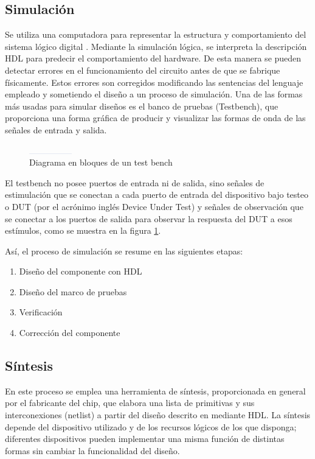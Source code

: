 \subsection{Simulación}
Se utiliza una computadora para representar la estructura y comportamiento del sistema lógico digital \citep{morris_mano}. Mediante la simulación lógica, se interpreta la descripción HDL para predecir el comportamiento del hardware. De esta manera se pueden detectar errores en el funcionamiento del circuito antes de que se fabrique físicamente. Estos errores son corregidos modificando las sentencias del lenguaje empleado y sometiendo el diseño a un proceso de simulación. Una de las formas más usadas para simular diseños es el banco de pruebas (Testbench), que proporciona una forma gráfica de producir y visualizar las formas de onda de las señales de entrada y salida.



\begin{figure}
\centering
\includegraphics[scale=.5]{./Figures/test_bench3.png}
\caption{Diagrama en bloques de un test bench}
\label{diag test bench}
\end{figure}


El testbench no posee puertos de entrada ni de salida, sino señales de estimulación que se conectan a cada puerto de entrada del dispositivo bajo testeo o DUT (por el acrónimo inglés Device Under Test) y señales de observación que se conectar a los puertos de salida para observar la respuesta del DUT a esos estímulos, como se muestra en la figura \ref{diag test bench}.

Así, el proceso de simulación se resume en las siguientes etapas:

\begin{enumerate}
\item
Diseño del componente con HDL
\item
Diseño del marco de pruebas
\item
Verificación
\item
Corrección del componente
\end{enumerate}


\subsection{Síntesis}

En este proceso se emplea una herramienta de síntesis, proporcionada en general por el fabricante del chip, que elabora una lista de primitivas y sus interconexiones (netlist) a partir del diseño descrito en mediante HDL. La síntesis depende del dispositivo utilizado y de los recursos lógicos de los que disponga; diferentes dispositivos pueden implementar una misma función de distintas formas sin cambiar la funcionalidad del diseño. 

